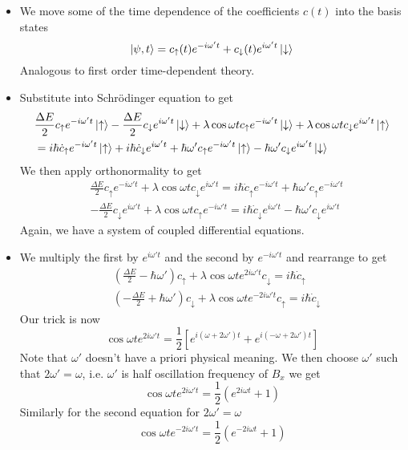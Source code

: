 \documentclass[11pt, a4paper]{article}
\newcommand{\Schro}{Schr\"{o}dinger\xspace}
\newcommand{\p}{\psi}  %
\newcommand{\ua}{\uparrow}  %
\newcommand{\da}{\downarrow}  %
\begin{document}
\begin{itemize}
	\item We move some of the time dependence of the coefficients $ c(t) $ into the basis states
	\begin{equation*}
		\ket{\p, t} = c_{\ua}(t)e^{-i\omega't} + c_{\da}(t)e^{i\omega't}\ket{\da}
	\end{equation*}
	Analogous to first order time-dependent theory.
	
	\item Substitute into \Schro equation to get
	\begin{align*}
		&\frac{\Delta E}{2}c_{\ua}e^{-i\omega't}\ket{\ua} - \frac{\Delta E}{2}c_{\da}e^{i\omega't}\ket{\da} + \lambda \cos \omega t c_{\ua}e^{-i\omega't}\ket{\da} +  \lambda \cos \omega t c_{\da}e^{i\omega't}\ket{\ua} \\
		&= i \hbar \dot{c}_{\ua}e^{-i\omega't}\ket{\ua} + i\hbar \dot{c}_{\da}e^{i\omega't} + \hbar \omega'c_{\ua}e^{-i\omega't} \ket{\ua} - \hbar \omega'c_{\da}e^{i\omega't}\ket{\da}
	\end{align*}
	We then apply orthonormality to get
	\begin{align*}
		& \frac{\Delta E}{2}c_{\ua}e^{-i\omega't} + \lambda \cos \omega t c_{\da}e^{i\omega't} = i\hbar \dot{c}_{\ua}e^{-i\omega't} + \hbar \omega' c_{\ua}e^{-i\omega't}\\
		& -\frac{\Delta E}{2}c_{\da}e^{i\omega't} + \lambda \cos \omega t c_{\ua}e^{-i\omega't} = i\hbar \dot{c}_{\da}e^{i\omega't} - \hbar \omega' c_{\da}e^{i\omega't}
	\end{align*}
	Again, we have a system of coupled differential equations. 
	
	\item We multiply the first by $ e^{i\omega' t} $ and the second by $ e^{-i\omega' t} $  and rearrange to get
	\begin{align*}
		&\left(\frac{\Delta E}{2} - \hbar \omega' \right) c_{\ua} + \lambda \cos \omega te^{2i\omega't}c_{\da} = i\hbar \dot{c}_{\ua}\\
		&\left(-\frac{\Delta E}{2} + \hbar \omega' \right) c_{\da} + \lambda \cos \omega te^{-2i\omega't}c_{\ua} = i\hbar \dot{c}_{\da}
	\end{align*}
	Our trick is now
	\begin{equation*}
		\cos \omega t e^{2i\omega't} = \frac{1}{2}\left[e^{i(\omega + 2\omega')t} + e^{i(-\omega + 2\omega')t}\right]
	\end{equation*}
	Note that $ \omega' $ doesn't have a priori physical meaning. We then choose $ \omega' $ such that $ 2 \omega' = \omega $, i.e. $ \omega' $ is half oscillation frequency of $ B_{x} $ we get
	\begin{equation*}
		\cos \omega t e^{2i\omega't} = \frac{1}{2}(e^{2i\omega t} + 1)
	\end{equation*}
	Similarly for the second equation for $ 2 \omega' = \omega $
	\begin{equation*}
		\cos \omega t e^{-2i\omega't} = \frac{1}{2}(e^{-2i\omega t} + 1)
	\end{equation*}
	

\end{itemize}
\end{document}
